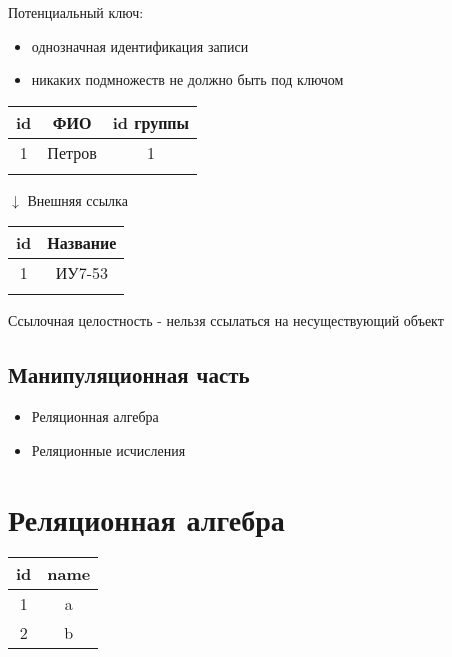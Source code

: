 \documentclass[a4paper, 14pt]{report}
\begin{document}
    Потенциальный ключ:

    \begin{itemize}
        \item однозначная идентификация записи
        \item никаких подмножеств не должно быть под ключом
    \end{itemize}

    \begin{center}
        \begin{tabular}{|c|c|c|}
            \hline
            id & ФИО & id группы \\
            \hline
            1 & Петров & 1 \\
            \hline
            & & \\
            \hline
        \end{tabular}

        $\downarrow$ Внешняя ссылка

        \begin{tabular}{|c|c|}
            \hline
            id & Название \\
            \hline
            1 & ИУ7-53 \\
            \hline
            & \\
            \hline
        \end{tabular}
    \end{center}

    Ссылочная целостность - нельзя ссылаться на несуществующий объект

    \subsection{Манипуляционная часть}

    \begin{itemize}
        \item Реляционная алгебра
        \item Реляционные исчисления
    \end{itemize}

    \section{Реляционная алгебра}

    \begin{tabular}{|c|c|}
        \hline
        id & name \\
        \hline
        1 & a \\
        \hline
        2 & b \\
        \hline
    \end{tabular}
\end{document}
